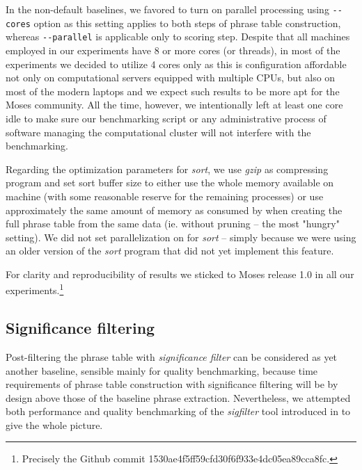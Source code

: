 In the non-default baselines, we favored to turn on parallel processing using \verb|--cores|
option as this setting applies to both steps of phrase table construction, whereas
\verb|--parallel| is applicable only to scoring step.
Despite that all machines employed in our experiments have 8 or more cores (or threads),
in most of the experiments we decided to utilize 4 cores only as this is configuration
affordable not only on computational servers equipped with multiple CPUs, but also on most
of the modern laptops and we expect such results to be more apt for the Moses community.
All the time, however, we intentionally left at least one core idle to make sure our
benchmarking script or any administrative process of software managing the computational
cluster will not interfere with the benchmarking.

Regarding the optimization parameters for \emph{sort}, we use \emph{gzip} as compressing
program and set sort buffer size to either use the whole memory available on machine
(with some reasonable reserve for the remaining processes) or use approximately the same
amount of memory as consumed by \eppex{} when creating the full phrase table from
the same data (ie. without pruning -- the most "hungry" setting).
We did not set parallelization on for \emph{sort} -- simply because we were using an older
version of the \emph{sort} program that did not yet implement this feature.

For clarity and reproducibility of results we sticked to Moses release 1.0 in all our 
experiments.\footnote{Precisely the Github commit 1530ae4f5ff59cfd30f6f933e4dc05ea89cca8fc.}

\subsection{Significance filtering}

Post-filtering the phrase table with \emph{significance filter} can be considered as yet
another baseline, sensible mainly for quality benchmarking, because time requirements
of phrase table construction with significance filtering will be by design above those of
the baseline phrase extraction.
Nevertheless, we attempted both performance and quality benchmarking of the \emph{sigfilter}
tool introduced in  to give the whole picture.

